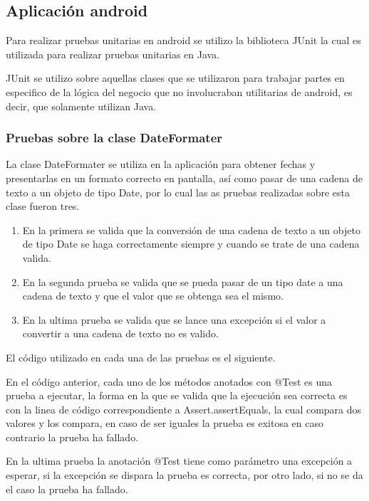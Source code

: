 \subsection{Aplicación android}

Para realizar pruebas unitarias en android se utilizo la biblioteca JUnit la cual es utilizada para realizar pruebas unitarias en Java.

JUnit se utilizo sobre aquellas clases que se utilizaron para trabajar partes en especifico de la lógica del negocio que no involucraban utilitarias de android, es decir, que solamente utilizan Java.

\subsubsection{Pruebas sobre la clase DateFormater}

La clase DateFormater se utiliza en la aplicación para obtener fechas y presentarlas en un formato correcto en pantalla, así como pasar de una cadena de texto a un objeto de tipo Date, por lo cual las as pruebas realizadas sobre esta clase fueron tres.

\begin{enumerate}
	\item En la primera se valida que la conversión de una cadena de texto a un objeto de tipo Date se haga correctamente siempre y cuando se trate de una cadena valida.
	\item En la segunda prueba se valida que se pueda pasar de un tipo date a una cadena de texto y que el valor que se obtenga sea el mismo.
	\item En la ultima prueba se valida que se lance una excepción si el valor a convertir a una cadena de texto no es valido.
\end{enumerate}

El código utilizado en cada una de las pruebas es el siguiente.



En el código anterior, cada uno de los métodos anotados con @Test es una prueba a ejecutar, la forma en la que se valida que la ejecución sea correcta es con la linea de código correspondiente a Assert.assertEquals, la cual compara dos valores y los compara, en caso de ser iguales la prueba es exitosa en caso contrario la prueba ha fallado.

En la ultima prueba la anotación @Test tiene como parámetro una excepción a esperar, si la excepción se dispara la prueba es correcta, por otro lado,  si no se da el caso la prueba ha fallado.

